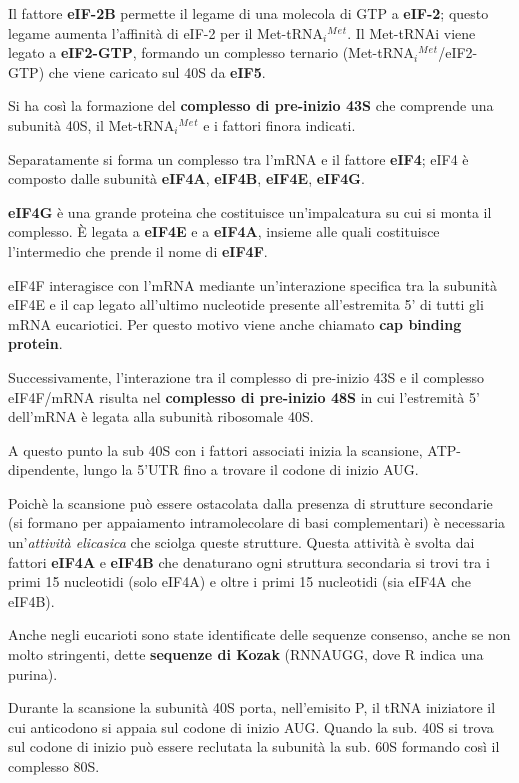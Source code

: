 \documentclass[11pt]{book}
\begin{document}
Il fattore \textbf{eIF-2B} permette il legame di una molecola di GTP a
\textbf{eIF-2}; questo legame aumenta l'affinità di eIF-2 per il
Met-tRNA\(_i\)\(^M\)\(^e\)\(^t\). Il Met-tRNAi viene legato a
\textbf{eIF2-GTP}, formando un complesso ternario
(Met-tRNA\(_i\)\(^M\)\(^e\)\(^t\)/eIF2-GTP) che viene caricato sul 40S
da \textbf{eIF5}.

Si ha così la formazione del \textbf{complesso di pre-inizio 43S} che
comprende una subunità 40S, il Met-tRNA\(_i\)\(^M\)\(^e\)\(^t\) e i
fattori finora indicati.

Separatamente si forma un complesso tra l'mRNA e il fattore
\textbf{eIF4}; eIF4 è composto dalle subunità \textbf{eIF4A},
\textbf{eIF4B}, \textbf{eIF4E}, \textbf{eIF4G}.

\textbf{eIF4G} è una grande proteina che costituisce un'impalcatura su
cui si monta il complesso. È legata a \textbf{eIF4E} e a
\textbf{eIF4A}, insieme alle quali costituisce l'intermedio che prende
il nome di \textbf{eIF4F}.

eIF4F interagisce con l'mRNA mediante un'interazione specifica tra la
subunità eIF4E e il cap legato all'ultimo nucleotide presente
all'estremita 5' di tutti gli mRNA eucariotici. Per questo motivo viene
anche chiamato \textbf{cap binding protein}.

Successivamente, l'interazione tra il complesso di pre-inizio 43S e il
complesso eIF4F/mRNA risulta nel \textbf{complesso di pre-inizio 48S} in
cui l'estremità 5' dell'mRNA è legata alla subunità ribosomale 40S.

A questo punto la sub 40S con i fattori associati inizia la scansione,
ATP-dipendente, lungo la 5'UTR fino a trovare il codone di inizio AUG.

Poichè la scansione può essere ostacolata dalla presenza di strutture
secondarie (si formano per appaiamento intramolecolare di basi
complementari) è necessaria un'\emph{attività elicasica} che sciolga
queste strutture. Questa attività è svolta dai fattori \textbf{eIF4A} e
\textbf{eIF4B} che denaturano ogni struttura secondaria si trovi tra i
primi 15 nucleotidi (solo eIF4A) e oltre i primi 15 nucleotidi (sia
eIF4A che eIF4B).

Anche negli eucarioti sono state identificate delle sequenze consenso,
anche se non molto stringenti, dette \textbf{sequenze di Kozak}
(RNNAUGG, dove R indica una purina).

Durante la scansione la subunità 40S porta, nell'emisito P, il tRNA
iniziatore il cui anticodono si appaia sul codone di inizio AUG. Quando
la sub. 40S si trova sul codone di inizio può essere reclutata la
subunità la sub. 60S formando così il complesso 80S.
\end{document}

